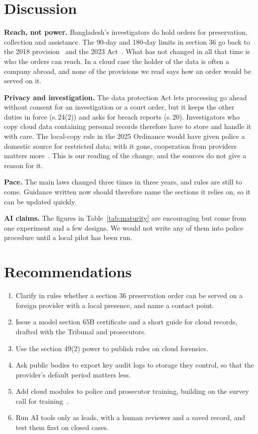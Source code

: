 \documentclass[conference]{IEEEtran}
\begin{document}
\section{Discussion}
\textbf{Reach, not power.} Bangladesh's investigators do hold orders for preservation, collection and assistance. The 90-day and 180-day limits in section 36 go back to the 2018 provision~\cite{unodc} and the 2023 Act~\cite{act2023}. What has not changed in all that time is who the orders can reach. In a cloud case the holder of the data is often a company abroad, and none of the provisions we read says how an order would be served on it.

\textbf{Privacy and investigation.} The data protection Act lets processing go ahead without consent for an investigation or a court order, but it keeps the other duties in force (s.\,24(2)) and asks for breach reports (s.\,20). Investigators who copy cloud data containing personal records therefore have to store and handle it with care. The local-copy rule in the 2025 Ordinance would have given police a domestic source for restricted data; with it gone, cooperation from providers matters more~\cite{pdpo,pdpa}. This is our reading of the change, and the sources do not give a reason for it.

\textbf{Pace.} The main laws changed three times in three years, and rules are still to come. Guidance written now should therefore name the sections it relies on, so it can be updated quickly.

\textbf{AI claims.} The figures in Table~\ref{tab:maturity} are encouraging but come from one experiment and a few designs. We would not write any of them into police procedure until a local pilot has been run.

\section{Recommendations}
\begin{enumerate}
\item Clarify in rules whether a section 36 preservation order can be served on a foreign provider with a local presence, and name a contact point.
\item Issue a model section 65B certificate and a short guide for cloud records, drafted with the Tribunal and prosecutors.
\item Use the section 49(2) power to publish rules on cloud forensics.
\item Ask public bodies to export key audit logs to storage they control, so that the provider's default period matters less.
\item Add cloud modules to police and prosecutor training, building on the survey call for training~\cite{sharmin}.
\item Run AI tools only as leads, with a human reviewer and a saved record, and test them first on closed cases.
\end{enumerate}
\end{document}
